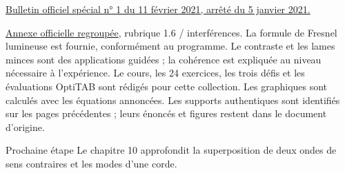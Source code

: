 \href{https://www.education.gouv.fr/bo/21/Special1/ESRS2035779A.htm}{Bulletin officiel spécial n° 1 du 11 février 2021, arrêté du 5 janvier 2021.}\par
\href{https://cache.media.education.gouv.fr/file/SPE1-MEN-MESRI-4-2-2021/64/8/spe779_annexe_1373648.pdf}{Annexe officielle regroupée}, rubrique 1.6 / interférences. La formule de Fresnel lumineuse est fournie, conformément au programme. Le contraste et les lames minces sont des applications guidées ; la cohérence est expliquée au niveau nécessaire à l’expérience.
Le cours, les 24 exercices, les trois défis et les évaluations OptiTAB sont rédigés pour cette collection. Les graphiques sont calculés avec les équations annoncées. Les supports authentiques sont identifiés sur les pages précédentes ; leurs énoncés et figures restent dans le document d’origine.
\begin{methode}{Prochaine étape}
Le chapitre 10 approfondit la superposition de deux ondes de sens contraires et les modes d’une corde.
\end{methode}

